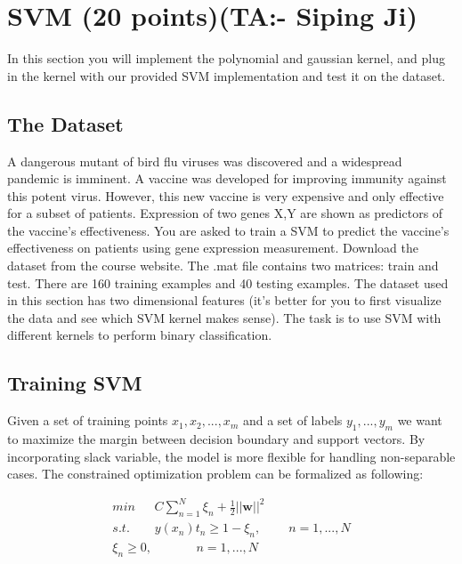 \documentclass[11pt]{article}
\newcommand{\mysecondta}{Siping Ji}
\begin{document}
\clearpage


\section{SVM (20 points)(TA:- \mysecondta)}

In this section you will implement the polynomial and gaussian kernel, and plug in the kernel with our provided SVM implementation and test it on the dataset.
\subsection{The Dataset}

A dangerous mutant of bird flu viruses was discovered and a widespread pandemic is imminent. A vaccine was developed for improving immunity against this potent virus. However, this new vaccine is very expensive and only effective for a subset of patients. Expression of two genes X,Y are shown as predictors of the vaccine's effectiveness. You are asked to train a SVM to predict the vaccine's effectiveness on patients using gene expression measurement. Download the dataset from the course website. The .mat file contains two matrices: train and test. There are 160 training examples and 40 testing examples. The dataset used in this section has two dimensional features (it's better for you to first visualize the data and see which SVM kernel makes sense). The task is to use SVM with different kernels to perform binary classification. 

\subsection{Training SVM}

Given a set of training points $x_1, x_2, ..., x_m$ and a set of labels $y_1, ..., y_m$ we want to maximize the margin between decision boundary and support vectors. By incorporating slack variable, the model is more flexible for handling non-separable cases. The constrained optimization problem can be formalized as following:

\begin{align}
min~~~~~~~C\sum_{n=1}^N{\xi_n} + \frac{1}{2}||\textbf{w}||^2~~~~~~~~~~~~~~~~~~~~~~~~~~\\
s.t. ~~~~~~~~~y(x_n)t_n \geq 1 - \xi_n, ~~~~~~~~~~n=1,...,N\\
     \xi_n \geq 0,~~~~~~~~~~~~~~~~n=1,...,N
\end{align}
\end{document}
